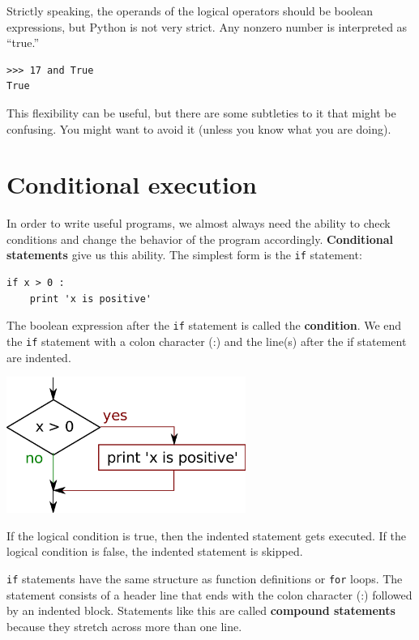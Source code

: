 \documentclass[10pt]{book}
\begin{document}
Strictly speaking, the operands of the logical operators should be
boolean expressions, but Python is not very strict.
Any nonzero number is interpreted as ``true.''

\beforeverb
\begin{verbatim}
>>> 17 and True
True
\end{verbatim}
\afterverb
%
This flexibility can be useful, but there are some subtleties to
it that might be confusing.  You might want to avoid it (unless
you know what you are doing).

\section{Conditional execution}
\label{conditional execution}


In order to write useful programs, we almost always need the ability
to check conditions and change the behavior of the program
accordingly.  {\bf Conditional statements} give us this ability.  The
simplest form is the {\tt if} statement:

\beforeverb
\begin{verbatim}
if x > 0 :
    print 'x is positive'
\end{verbatim}
\afterverb
%
The boolean expression after the {\tt if} statement is
called the {\bf condition}.  We end the {\tt if} 
statement with a colon character (:) and the line(s) 
after the if statement are indented.  

\beforefig
\centerline{\includegraphics[height=1.75in]{figs2/if.eps}}
\afterfig

If the logical condition is true, then the indented
statement gets executed.  If the logical condition is 
false, the indented statement is skipped.


{\tt if} statements have the same structure as function definitions
or {\tt for} loops.  The statement consists of a header line
that ends with the colon character (:) 
followed by an indented block.  Statements like this are
called {\bf compound statements} because they stretch 
across more than one line.
\end{document}
